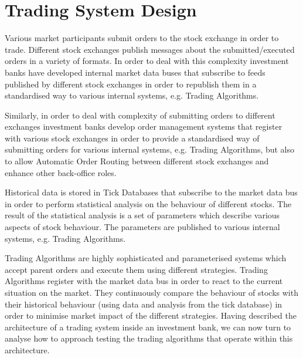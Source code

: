 \section{Trading System Design} 



Various market participants submit orders to the stock exchange in order to trade. Different stock exchanges publish messages about the submitted/executed orders in a variety of formats. In order to deal with this complexity investment banks have developed internal market data buses that subscribe to feeds published by different stock exchanges in order to republish them in a standardised way to various internal systems, e.g. Trading Algorithms.

Similarly, in order to deal with complexity of submitting orders to different exchanges investment banks develop order management systems that register with various stock exchanges in order to provide a standardised way of submitting orders for various internal systems, e.g. Trading Algorithms, but also to allow Automatic Order Routing between different stock exchanges and enhance other back-office roles.

Historical data is stored in Tick Databases that subscribe to the market data bus in order to perform statistical analysis on the behaviour of different stocks. The result of the statistical analysis is a set of parameters which describe various aspects of stock behaviour. The parameters are published to various internal systems, e.g. Trading Algorithms.

Trading Algorithms are highly sophisticated and parameterised systems which accept parent orders and execute them using different strategies. Trading Algorithms register with the market data bus in order to react to the current situation on the market. They continuously compare the behaviour of stocks with their historical behaviour (using data and analysis from the tick database) in order to minimise market impact of the different strategies. Having described the architecture of a trading system inside an investment bank, we can now turn to analyse how to approach testing the trading algorithms that operate within this architecture.

